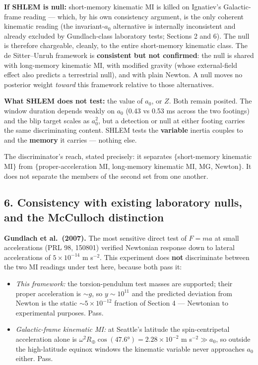 \documentclass[
]{article}
\providecommand{\tightlist}{%
  \setlength{\itemsep}{0pt}\setlength{\parskip}{0pt}}
\begin{document}
\textbf{If SHLEM is null:} short-memory kinematic MI is killed on
Ignatiev's Galactic-frame reading --- which, by his own consistency
argument, is the only coherent kinematic reading (the invariant-\(a_0\)
alternative is internally inconsistent and already excluded by
Gundlach-class laboratory tests; Sections 2 and 6). The null is
therefore chargeable, cleanly, to the entire short-memory kinematic
class. The de Sitter--Unruh framework is \textbf{consistent but not
confirmed}: the null is shared with long-memory kinematic MI, with
modified gravity (whose external-field effect also predicts a
terrestrial null), and with plain Newton. A null moves no posterior
weight \emph{toward} this framework relative to those alternatives.

\textbf{What SHLEM does not test:} the value of \(a_0\), or \(Z\). Both
remain posited. The window duration depends weakly on \(a_0\) (0.43 vs
0.53 ms across the two footings) and the blip target scales as
\(a_0^2\), but a detection or null at either footing carries the same
discriminating content. SHLEM tests the \textbf{variable} inertia
couples to and the \textbf{memory} it carries --- nothing else.

The discriminator's reach, stated precisely: it separates
\(\{\)short-memory kinematic MI\(\}\) from \(\{\)proper-acceleration MI,
long-memory kinematic MI, MG, Newton\(\}\). It does not separate the
members of the second set from one another.

\subsection{6. Consistency with existing laboratory nulls, and the
McCulloch
distinction}\label{consistency-with-existing-laboratory-nulls-and-the-mcculloch-distinction}

\textbf{Gundlach et al.~(2007).} The most sensitive direct test of
\(F = ma\) at small accelerations (PRL 98, 150801) verified Newtonian
response down to lateral accelerations of \(5\times10^{-14}\) m
s\(^{-2}\). This experiment does \textbf{not} discriminate between the
two MI readings under test here, because both pass it:

\begin{itemize}
\tightlist
\item
  \emph{This framework:} the torsion-pendulum test masses are supported;
  their proper acceleration is \(\sim g\), so \(y \sim 10^{11}\) and the
  predicted deviation from Newton is the static \(\sim 5\times10^{-12}\)
  fraction of Section 4 --- Newtonian to experimental purposes. Pass.
\item
  \emph{Galactic-frame kinematic MI:} at Seattle's latitude the
  spin-centripetal acceleration alone is
  \(\omega^2 R_\oplus \cos(47.6°) = 2.28\times10^{-2}\) m
  s\(^{-2} \gg a_0\), so outside the high-latitude equinox windows the
  kinematic variable never approaches \(a_0\) either. Pass.
\end{itemize}
\end{document}
